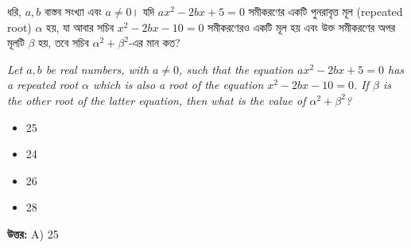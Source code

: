 \documentclass[12pt, a4paper]{article}
\begin{document}
\begin{tcolorbox}[questionbox={প্রশ্ন (Question) 37}]
    \noindent
    ধরি, $a, b$ বাস্তব সংখ্যা এবং $a \ne 0$। যদি $ax^2 - 2bx + 5 = 0$ সমীকরণের একটি পুনরাবৃত্ত মূল (repeated root) $\alpha$ হয়, যা আবার সচিব $x^2 - 2bx - 10 = 0$ সমীকরণেরও একটি মূল হয় এবং উক্ত সমীকরণের অপর মূলটি $\beta$ হয়, তবে সচিব $\alpha^2 + \beta^2$-এর মান কত?
    
    \vspace{0.8em}
    \begin{english}
    \noindent\textit{\color{darkgray}
    Let $a, b$ be real numbers, with $a \ne 0$, such that the equation $ax^2 - 2bx + 5 = 0$ has a repeated root $\alpha$ which is also a root of the equation $x^2 - 2bx - 10 = 0$. If $\beta$ is the other root of the latter equation, then what is the value of $\alpha^2 + \beta^2$?
    }
    \end{english}
\end{tcolorbox}

\begin{itemize}[label={}, leftmargin=1cm, itemsep=0.5em]
    \item[\textbf{A)}] 25
    \item[\textbf{B)}] 24
    \item[\textbf{C)}] 26
    \item[\textbf{D)}] 28
\end{itemize}

\vspace{0.5em}
\begin{tcolorbox}[answerbox]
    \textbf{\color{success} উত্তর:} A) 25
\end{tcolorbox}
\vspace{1em}
\end{document}
